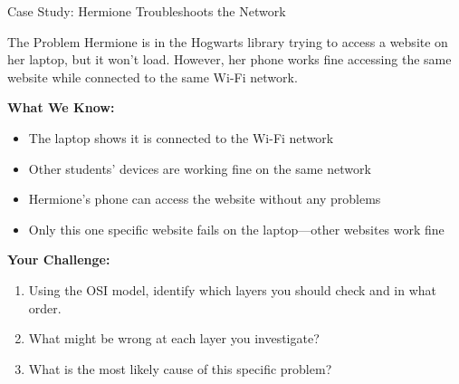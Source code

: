 \documentclass[aspectratio=169]{beamer}
\begin{document}
\begin{frame}{Case Study: Hermione Troubleshoots the Network}

\begin{alertblock}{The Problem}
Hermione is in the Hogwarts library trying to access a website on her laptop, but it won't load. However, her phone works fine accessing the same website while connected to the same Wi-Fi network.
\end{alertblock}

\vspace{0.3cm}

\textbf{What We Know:}
\begin{itemize}
    \item The laptop shows it is connected to the Wi-Fi network
    \item Other students' devices are working fine on the same network
    \item Hermione's phone can access the website without any problems
    \item Only this one specific website fails on the laptop—other websites work fine
\end{itemize}

\vspace{0.3cm}

\textbf{Your Challenge:}
\begin{enumerate}
    \item Using the OSI model, identify which layers you should check and in what order.
    \item What might be wrong at each layer you investigate?
    \item What is the most likely cause of this specific problem?
\end{enumerate}

\end{frame}
\end{document}
